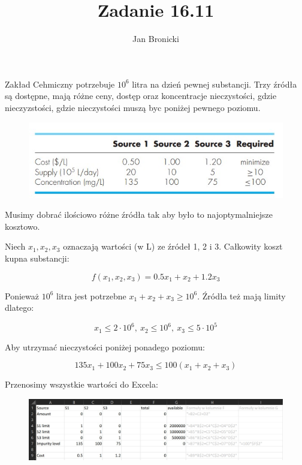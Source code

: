 \documentclass{article}
\title{Zadanie 16.11}
\author{Jan Bronicki}
\date{}
\begin{document}
\maketitle


Zakład Cehmiczny potrzebuje $10^{6}$ litra na dzień pewnej substancji. Trzy źródła są dostępne, mają różne ceny, dostęp oraz koncentracje nieczystości, gdzie nieczyzstości, gdzie nieczystości muszą byc poniżej pewnego poziomu.


\begin{figure}[h!]
    \centering
    \includegraphics[scale=0.75]{sources.jpg}
\end{figure}


Musimy dobrać ilościowo różne źródła tak aby było to najoptymalniejsze kosztowo.

Niech $x_{1}, x_{2}, x_{3}$ oznaczają wartości (w L) ze źródeł 1, 2 i 3. Całkowity koszt kupna substancji:

$$
    f(x_{1}, x_{2}, x_{3})=0.5x_{1} + x_{2} + 1.2x_{3}
$$

Ponieważ $10^{6}$ litra jest potrzebne $x_{1} + x_{2} + x_{3} \geq 10^{6}$. Źródła też mają limity dlatego:

$$
    x_{1} \leq 2\cdot 10^{6}, \ x_{2} \leq 10^{6}, \ x_{3} \leq 5\cdot 10^{5}
$$

Aby utrzymać nieczystości poniżej ponadego poziomu:

$$
    135x_{1}+100x_{2}+75x_{3} \leq 100(x_{1}+x_{2}+x_{3})
$$

\newpage

Przenosimy wszystkie wartości do Excela:

\begin{figure}[h!]
    \hspace{-6em}
    \includegraphics[scale=0.5]{przed_arkusz.jpg}
\end{figure}
\end{document}
